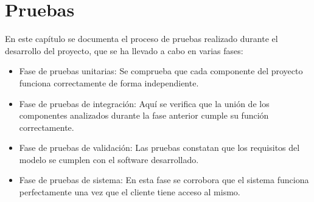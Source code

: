 

\chapter{Pruebas}
\thispagestyle{chapterpage}

En este capítulo se documenta el proceso de pruebas realizado durante el desarrollo del proyecto, que 
se ha llevado a cabo en varias fases:

\begin{itemize}
    \item Fase de pruebas unitarias: Se comprueba que cada componente del proyecto funciona correctamente 
    de forma independiente.
    \item Fase de pruebas de integración: Aquí se verifica que la unión de los componentes analizados 
    durante la fase anterior cumple su función correctamente.
    \item Fase de pruebas de validación: Las pruebas constatan que los requisitos del modelo se cumplen 
    con el software desarrollado.
    \item Fase de pruebas de sistema: En esta fase se corrobora que el sistema funciona perfectamente una 
    vez que el cliente tiene acceso al mismo.
\end{itemize}











